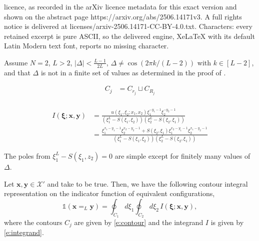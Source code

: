 \documentclass[10pt,a4paper]{amsart}
\begin{document}
licence, as recorded in the arXiv licence metadata for this exact version and shown on the abstract page https://arxiv.org/abs/2506.14171v3. A full rights notice is delivered at licenses/arxiv-2506.14171-CC-BY-4.0.txt. Characters: every retained excerpt is pure ASCII, so the delivered engine, XeLaTeX with its default Latin Modern text font, reports no missing character.
\begin{assumption}\label{a:N=2 proof assumptions}
    Assume $N=2$, $L>2$, $|\Delta|<\frac{L-1}{2L}$, $\Delta\neq\cos(2\pi k/(L-2))$ with $k\in [L-2]$, and that $\Delta$ is not in a finite set of values as determined in the proof of .
\end{assumption}

\begin{equation}\label{e:contour}
\begin{split}
    C_j &= C_{r_j} \sqcup C_{R_j} \\
\end{split}
\end{equation}

\begin{equation}\label{e:integrand}
\begin{split}
    I(\boldsymbol{\xi};\mathbf{x},\mathbf{y})&= \frac{u(\xi_1,\xi_2;x_1,x_2)\xi_1^{-y_1-1}\xi_2^{-y_2-1}}{\left(\xi_1^L - S(\xi_1,\xi_2) \right)\left(\xi_2^L - S(\xi_2,\xi_1) \right)} \\
    &=  \frac{\xi_1^{x_1-y_1-1}\xi_2^{x_2-y_2-1}+S(\xi_2,\xi_1)\xi_1^{x_2-y_1-1}\xi_2^{x_1-y_2-1}}{\left(\xi_1^L - S(\xi_1,\xi_2) \right)\left(\xi_2^L - S(\xi_2,\xi_1) \right)}
\end{split}
\end{equation}

\begin{lemma}\label{l: xi_1 poles simple}
    The poles from $\xi_1^L-S(\xi_1,z_2)=0$ are simple except for finitely many values of $\Delta$. 
\end{lemma}

\begin{lemma}\label{l:Indicator function expansion}
Let $\boldsymbol{x},\boldsymbol{y} \in \mathcal{X}'$ and take  to be true. Then, we have the following contour integral representation on the indicator function of equivalent configurations,
\begin{equation}\label{e:N=2ProofIndicator}
    \mathds{1}(\boldsymbol{x}=_{L} \boldsymbol{y}) = \oint_{C_1} d\xi_1 \oint_{C_2} d\xi_2 \, I(\boldsymbol{\xi};\mathbf{x},\mathbf{y}),
\end{equation}
where the contours $C_j$ are given by \eqref{e:contour} and the integrand $I$ is given by \eqref{e:integrand}.
\end{lemma}
\end{document}
